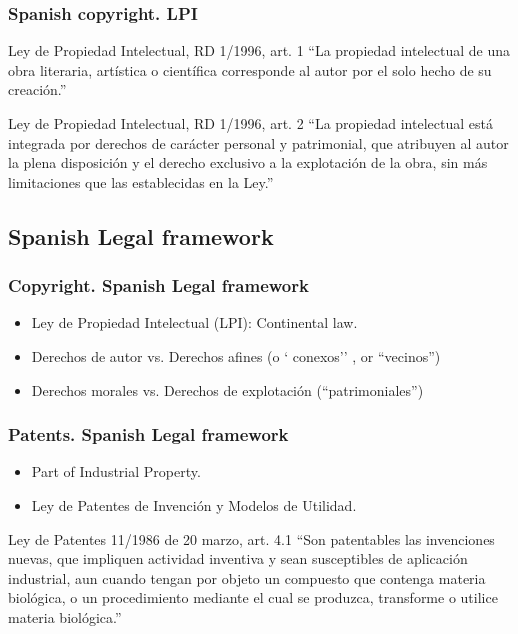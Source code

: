 \documentclass{beamer}
\begin{document}
\begin{frame}
\frametitle{Spanish copyright. LPI}

\begin{block}{Ley de Propiedad Intelectual, RD 1/1996, art. 1}
``La propiedad intelectual de una obra literaria, artística o científica corresponde al autor por el solo hecho de su creación.''
\end{block}

\begin{block}{Ley de Propiedad Intelectual, RD 1/1996, art. 2}
``La propiedad intelectual está integrada por derechos de carácter personal y patrimonial, que atribuyen al autor la plena disposición y el \alert{derecho exclusivo} a la explotación de la obra, sin más \alert{limitaciones} que las establecidas en la Ley.''
\end{block}

\end{frame}

\subsection{Spanish Legal framework}
\begin{frame}
\frametitle{Copyright. Spanish Legal framework}

\begin{itemize}
\item Ley de Propiedad Intelectual (LPI): Continental law. 
\item Derechos de autor vs. Derechos afines (o ` conexos'' , or ``vecinos'') 
\item Derechos morales vs. Derechos de explotación (``patrimoniales'')
\end{itemize}

\end{frame}

\begin{frame}
\frametitle{Patents. Spanish Legal framework}

\begin{itemize}
\item Part of Industrial Property.
\item Ley de Patentes de Invención y Modelos de Utilidad.
\end{itemize}

\begin{block}{Ley de Patentes 11/1986 de 20 marzo, art. 4.1}
``\alert{Son patentables las invenciones nuevas, que impliquen actividad inventiva y sean susceptibles de aplicación industrial}, aun cuando tengan por objeto un compuesto que contenga materia biológica, o un procedimiento mediante el cual se produzca, transforme o utilice materia biológica.''
\end{block}

\end{frame}
\end{document}
